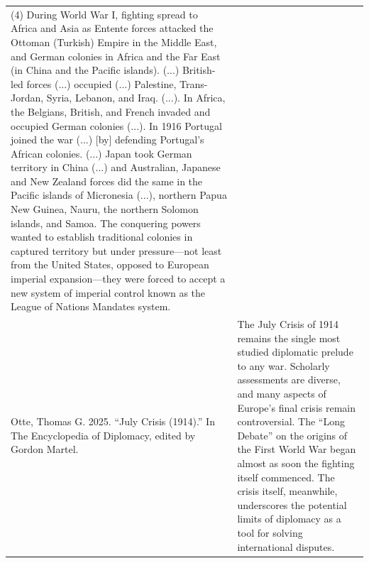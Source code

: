 {\begin{longtable}{p{}p{}}
(4) During World War I, fighting spread to Africa and Asia as Entente forces attacked the Ottoman (Turkish) Empire in the Middle East, and German colonies in Africa and the Far East (in China and the Pacific islands). (...) British-led forces (...) occupied (...) Palestine, Trans-Jordan, Syria, Lebanon, and Iraq. (...). In Africa, the Belgians, British, and French invaded and occupied German colonies (...). In 1916 Portugal joined the war (...) [by] defending Portugal's African colonies. (...) Japan took German territory in China (...) and Australian, Japanese and New Zealand forces did the same in the Pacific islands of Micronesia (...), northern Papua New Guinea, Nauru, the northern Solomon islands, and Samoa. The conquering powers wanted to establish traditional colonies in captured territory but under pressure—not least from the United States, opposed to European imperial expansion—they were forced to accept a new system of imperial control known as the League of Nations Mandates system.
\\
Otte, Thomas G. 2025. “July Crisis (1914).” In The Encyclopedia of Diplomacy, edited by Gordon Martel. & The July Crisis of 1914 remains the single most studied diplomatic prelude to any war. Scholarly assessments are diverse, and many aspects of Europe's final crisis remain controversial. The “Long Debate” on the origins of the First World War began almost as soon the fighting itself commenced. The crisis itself, meanwhile, underscores the potential limits of diplomacy as a tool for solving international disputes.

\end{longtable}}
